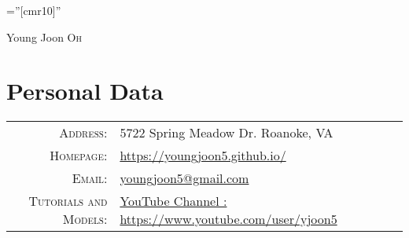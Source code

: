 \documentclass[a4paper,10pt]{article}
\begin{document}
 


\font\fb=''[cmr10]'' %

\par{\centering
		{\huge Young Joon \textsc{Oh}
	}\bigskip\par}


\section{Personal Data}

\begin{tabular}{rl}
    \textsc{Address:}   & 5722 Spring Meadow Dr. Roanoke, VA\\
    \textsc{Homepage:}   & \href{https://youngjoon5.github.io/}{https://youngjoon5.github.io/}\\
    \textsc{Email:}      & \href{mailto:youngjoon5@gmail.com}{youngjoon5@gmail.com}\\
    \textsc{Tutorials and Models:}   & \href{https://www.youtube.com/user/yjoon5}{YouTube Channel : https://www.youtube.com/user/yjoon5}\\
\end{tabular}


\end{document}
